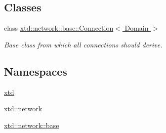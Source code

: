 \subsection*{Classes}
\begin{DoxyCompactItemize}
\item 
class \hyperlink{classxtd_1_1network_1_1base_1_1Connection}{xtd\-::network\-::base\-::\-Connection$<$ Domain $>$}
\begin{DoxyCompactList}\small\item\em Base class from which all connections should derive. \end{DoxyCompactList}\end{DoxyCompactItemize}
\subsection*{Namespaces}
\begin{DoxyCompactItemize}
\item 
\hyperlink{namespacextd}{xtd}
\item 
\hyperlink{namespacextd_1_1network}{xtd\-::network}
\item 
\hyperlink{namespacextd_1_1network_1_1base}{xtd\-::network\-::base}
\end{DoxyCompactItemize}
